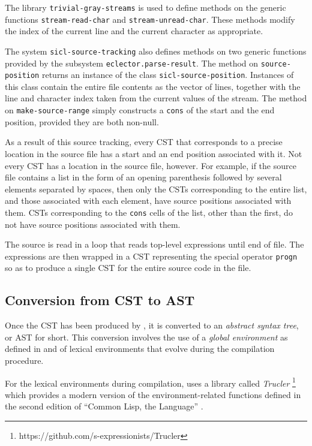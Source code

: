 The library \texttt{trivial-gray-streams} is used to define methods on
the generic functions \texttt{stream-read-char} and
\texttt{stream-unread-char}.  These methods modify the index of the
current line and the current character as appropriate.

The system \texttt{sicl-source-tracking} also defines methods on two
generic functions provided by the \eclector{} subsystem
\texttt{eclector.parse-result}.  The method on
\texttt{source-position} returns an instance of the class
\texttt{sicl-source-position}.  Instances of this class contain the
entire file contents as the vector of lines, together with the line
and character index taken from the current values of the stream.  The
method on \texttt{make-source-range} simply constructs a \texttt{cons}
of the start and the end position, provided they are both non-null.

As a result of this source tracking, every CST that corresponds to a
precise location in the source file has a start and an end position
associated with it.  Not every CST has a location in the source file,
however.  For example, if the source file contains a list in the form
of an opening parenthesis followed by several elements separated by
spaces, then only the CSTs corresponding to the entire list, and those
associated with each element, have source positions associated with
them.  CSTs corresponding to the \texttt{cons} cells of the list,
other than the first, do not have source positions associated with
them.

The source is read in a loop that reads top-level expressions until
end of file.  The expressions are then wrapped in a CST representing
the special operator \texttt{progn} so as to produce a single CST for
the entire source code in the file.

\subsection{Conversion from CST to AST}

Once the CST has been produced by \eclector{}, it is converted to an
\emph{abstract syntax tree}, or AST for short.  This conversion
involves the use of a \emph{global environment} as defined in
 and of lexical environments that
evolve during the compilation procedure.

For the lexical environments during compilation, \sysname{} uses a
library called \emph{Trucler}%
\footnote{https://github.com/s-expressionists/Trucler} which provides
a modern version of the environment-related functions defined in
the second edition of ``Common Lisp, the Language''
\cite{Steele:1990:CLL:95411}.

